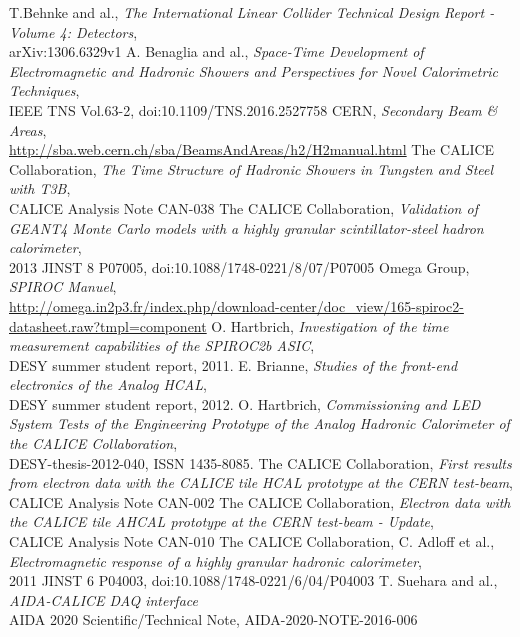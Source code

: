 \begin{thebibliography}{10}
T.Behnke and al., \textit{The International Linear Collider Technical Design Report - Volume 4: Detectors}, \\
arXiv:1306.6329v1
	A. Benaglia and al., \textit{Space-Time Development of Electromagnetic and Hadronic Showers and Perspectives for Novel Calorimetric Techniques}, \\
	IEEE TNS Vol.63-2, doi:10.1109/TNS.2016.2527758
	CERN, \textit{Secondary Beam \& Areas}, \\
	\href{http://sba.web.cern.ch/sba/BeamsAndAreas/h2/H2manual.html}{http://sba.web.cern.ch/sba/BeamsAndAreas/h2/H2manual.html}
	The CALICE Collaboration, \textit{The Time Structure of Hadronic Showers in Tungsten and Steel with T3B}, \\
	CALICE Analysis Note CAN-038
	The CALICE Collaboration, \textit{Validation of GEANT4 Monte Carlo models with a highly granular scintillator-steel hadron calorimeter}, \\
	2013 JINST 8 P07005, doi:10.1088/1748-0221/8/07/P07005
	Omega Group, \textit{SPIROC Manuel}, \\
	\href{http://omega.in2p3.fr/index.php/download-center/doc_view/165-spiroc2-datasheet.raw?tmpl=component}{http://omega.in2p3.fr/index.php/download-center/doc\_view/165-spiroc2-datasheet.raw?tmpl=component}
	 O. Hartbrich, \textit{Investigation of the time measurement capabilities of the SPIROC2b ASIC}, \\
	 DESY summer student report, 2011.
	 E. Brianne, \textit{Studies of the front-end electronics of the Analog HCAL}, \\
	 DESY summer student report, 2012.
	 O. Hartbrich, \textit{Commissioning and LED System Tests of the Engineering Prototype of the Analog Hadronic Calorimeter of the CALICE Collaboration}, \\
	 DESY-thesis-2012-040, ISSN 1435-8085.
	 The CALICE Collaboration, \textit{First results from electron data with the CALICE tile HCAL prototype at the CERN test-beam}, \\
	 CALICE Analysis Note CAN-002
	 The CALICE Collaboration, \textit{Electron data with the CALICE tile AHCAL prototype at the CERN test-beam - Update}, \\
	 CALICE Analysis Note CAN-010
	 The CALICE Collaboration, C. Adloff et al., \textit{Electromagnetic response of a highly granular hadronic calorimeter}, \\
	 2011 JINST 6 P04003, doi:10.1088/1748-0221/6/04/P04003
	 T. Suehara and al., \textit{AIDA-CALICE DAQ interface} \\
	 AIDA 2020 Scientific/Technical Note, AIDA-2020-NOTE-2016-006
\end{thebibliography}
